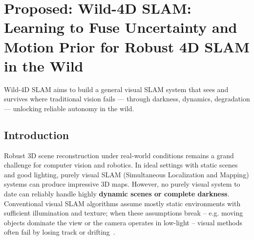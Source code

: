 \chapter{Proposed: Wild-4D SLAM: Learning to Fuse Uncertainty and Motion Prior for Robust 4D SLAM in the Wild}
\label{chapter:sparsevio}

\begin{framed} 
Wild-4D SLAM aims to build a general visual SLAM system that sees and survives where traditional vision fails — through darkness, dynamics, degradation — unlocking reliable autonomy in the wild.
\end{framed}

\section{Introduction}

Robust 3D scene reconstruction under real-world conditions remains a grand challenge for computer vision and robotics. In ideal settings with static scenes and good lighting, purely visual SLAM (Simultaneous Localization and Mapping) systems can produce impressive 3D maps. However, no purely visual system to date can reliably handle highly \textbf{dynamic scenes or complete darkness}. Conventional visual SLAM algorithms assume mostly static environments with sufficient illumination and texture; when these assumptions break – e.g. moving objects dominate the view or the camera operates in low-light – visual methods often fail by losing track or drifting~\cite{li2024megasam}.


